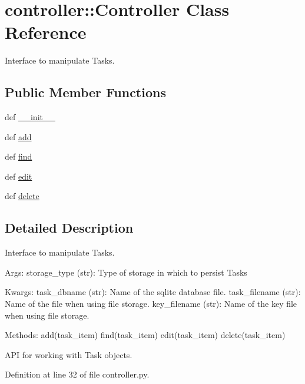 \hypertarget{classcontroller_1_1Controller}{
\section{controller\-:\-:\-Controller \-Class \-Reference}
\label{classcontroller_1_1Controller}
}


\-Interface to manipulate \-Tasks.  


\subsection*{\-Public \-Member \-Functions}
\begin{DoxyCompactItemize}
\item 
def \hyperlink{classcontroller_1_1Controller_a2792c7e8125686af1f3b942bb861a1b7}{\-\_\-\-\_\-init\-\_\-\-\_\-}
\item 
def \hyperlink{classcontroller_1_1Controller_a4540b41b591ba7844cea2004c4c3fa73}{add}
\item 
def \hyperlink{classcontroller_1_1Controller_ac29e868e3a4a0baf42201008b96ce7eb}{find}
\item 
def \hyperlink{classcontroller_1_1Controller_a39cc3bff3164e8ec52b2b4d50bbd5575}{edit}
\item 
def \hyperlink{classcontroller_1_1Controller_a81b5ea991456c3b37d02d84c790d67f0}{delete}
\end{DoxyCompactItemize}


\subsection{\-Detailed \-Description}
\-Interface to manipulate \-Tasks. 

\-Args\-: storage\-\_\-type (str)\-: \-Type of storage in which to persist \-Tasks

\-Kwargs\-: task\-\_\-dbname (str)\-: \-Name of the sqlite database file. task\-\_\-filename (str)\-: \-Name of the file when using file storage. key\-\_\-filename (str)\-: \-Name of the key file when using file storage.

\-Methods\-: add(task\-\_\-item) find(task\-\_\-item) edit(task\-\_\-item) delete(task\-\_\-item)

\-A\-P\-I for working with \-Task objects. 

\-Definition at line 32 of file controller.\-py.




